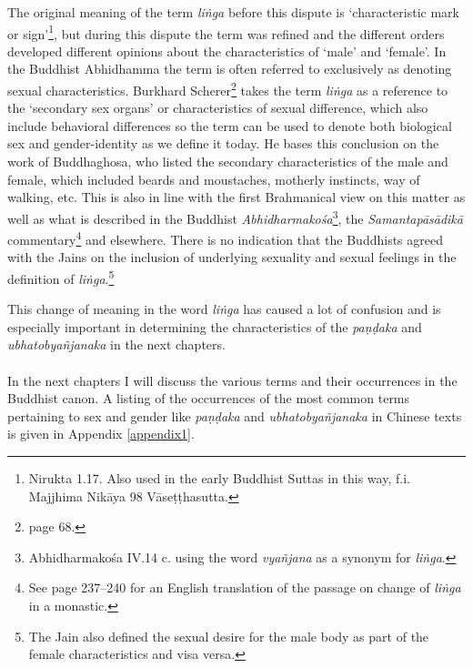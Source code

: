 The original meaning of the term {\em liṅga} before this dispute is `characteristic mark or sign'\footnote{Nirukta 1.17. Also used in the early Buddhist Suttas in this way, f.i. Majjhima Nikāya 98 Vāseṭṭhasutta.}, but during this dispute the term was refined and the different orders developed different opinions about the characteristics of `male' and `female'. In the Buddhist Abhidhamma the term is often referred to exclusively as denoting sexual characteristics. Burkhard Scherer\footnote{\cite{scherer} page 68.} takes the term {\em liṅga} as a reference to the `secondary sex organs' or characteristics of sexual difference, which also include behavioral differences so the term can be used to denote both biological sex and gender-identity as we define it today. He bases this conclusion on the work of Buddhaghosa, who listed the secondary characteristics of the male and female, which included beards and moustaches, motherly instincts, way of walking, etc. This is also in line with the first Brahmanical view on this matter as well as what is described in the Buddhist {\em Abhidharmakośa}\footnote{Abhidharmakośa IV.14 c. using the word {\em vyañjana} as a synonym for {\em liṅga}.}, the {\em Samantapāsādikā} commentary\footnote{See \cite{anderson2016} page 237–240 for an English translation of the passage on change of {\em liṅga} in a monastic.} and elsewhere. There is no indication that the Buddhists agreed with the Jains on the inclusion of underlying sexuality and sexual feelings in the definition of {\em liṅga}.\footnote{The Jain also defined the sexual desire for the male body as part of the female characteristics and visa versa.}

This change of meaning in the word {\em liṅga} has caused a lot of confusion and is especially important in determining the characteristics of the {\em paṇḍaka} and {\em ubhatob­yañ­janaka} in the next chapters.\\
\\
In the next chapters I will discuss the various terms and their occurrences in the Buddhist canon. A listing of the occurrences of the most common terms pertaining to sex and gender like {\em paṇḍaka} and {\em ubhatob­yañ­janaka} in Chinese texts is given in Appendix \ref{appendix1}. 
